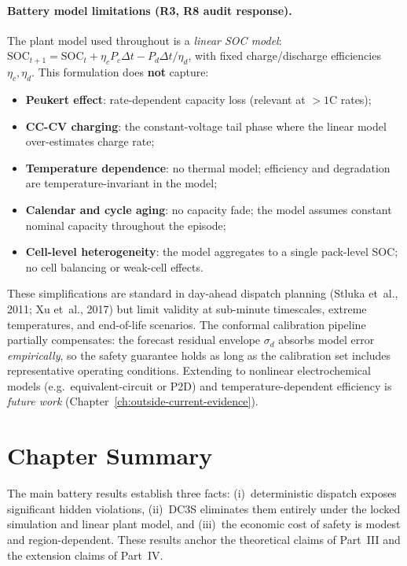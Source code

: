 \paragraph{Battery model limitations (R3, R8 audit response).}
The plant model used throughout is a \emph{linear SOC model}:
$\text{SOC}_{t+1}=\text{SOC}_t + \eta_c P_c \Delta t - P_d \Delta t / \eta_d$,
with fixed charge/discharge efficiencies $\eta_c, \eta_d$.  This
formulation does \textbf{not} capture:
\begin{itemize}
  \item \textbf{Peukert effect}: rate-dependent capacity loss (relevant at
    $>1$C rates);
  \item \textbf{CC-CV charging}: the constant-voltage tail phase where the
    linear model over-estimates charge rate;
  \item \textbf{Temperature dependence}: no thermal model; efficiency and
    degradation are temperature-invariant in the model;
  \item \textbf{Calendar and cycle aging}: no capacity fade; the model
    assumes constant nominal capacity throughout the episode;
  \item \textbf{Cell-level heterogeneity}: the model aggregates to a
    single pack-level SOC; no cell balancing or weak-cell effects.
\end{itemize}
These simplifications are standard in day-ahead dispatch planning
(Stluka et~al., 2011; Xu et~al., 2017) but limit validity at
sub-minute timescales, extreme temperatures, and end-of-life scenarios.
The conformal calibration pipeline partially compensates: the forecast
residual envelope $\sigma_d$ absorbs model error \emph{empirically}, so
the safety guarantee holds as long as the calibration set includes
representative operating conditions.  Extending to nonlinear
electrochemical models (e.g.\ equivalent-circuit or P2D) and
temperature-dependent efficiency is \emph{future work}
(Chapter~\ref{ch:outside-current-evidence}).

\section{Chapter Summary}

The main battery results establish three facts: (i)~deterministic dispatch
exposes significant hidden violations, (ii)~DC3S eliminates them entirely
under the locked simulation and linear plant model,
and (iii)~the economic cost of safety is modest and region-dependent.
These results anchor the theoretical claims of Part~III and the extension
claims of Part~IV.
